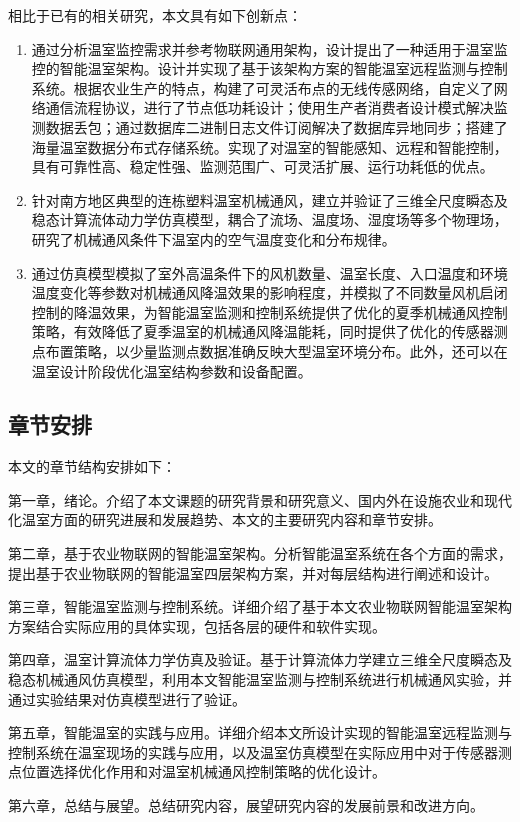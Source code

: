 相比于已有的相关研究，本文具有如下创新点：
		\begin{enumerate}
			\item 通过分析温室监控需求并参考物联网通用架构，设计提出了一种适用于温室监控的智能温室架构。设计并实现了基于该架构方案的智能温室远程监测与控制系统。根据农业生产的特点，构建了可灵活布点的无线传感网络，自定义了网络通信流程协议，进行了节点低功耗设计；使用生产者消费者设计模式解决监测数据丢包；通过数据库二进制日志文件订阅解决了数据库异地同步；搭建了海量温室数据分布式存储系统。实现了对温室的智能感知、远程和智能控制，具有可靠性高、稳定性强、监测范围广、可灵活扩展、运行功耗低的优点。
			\item 针对南方地区典型的连栋塑料温室机械通风，建立并验证了三维全尺度瞬态及稳态计算流体动力学仿真模型，耦合了流场、温度场、湿度场等多个物理场，研究了机械通风条件下温室内的空气温度变化和分布规律。
			\item 通过仿真模型模拟了室外高温条件下的风机数量、温室长度、入口温度和环境温度变化等参数对机械通风降温效果的影响程度，并模拟了不同数量风机启闭控制的降温效果，为智能温室监测和控制系统提供了优化的夏季机械通风控制策略，有效降低了夏季温室的机械通风降温能耗，同时提供了优化的传感器测点布置策略，以少量监测点数据准确反映大型温室环境分布。此外，还可以在温室设计阶段优化温室结构参数和设备配置。
		\end{enumerate}	
	\subsection{章节安排}
	本文的章节结构安排如下：
	
第一章，绪论。介绍了本文课题的研究背景和研究意义、国内外在设施农业和现代化温室方面的研究进展和发展趋势、本文的主要研究内容和章节安排。

第二章，基于农业物联网的智能温室架构。分析智能温室系统在各个方面的需求，提出基于农业物联网的智能温室四层架构方案，并对每层结构进行阐述和设计。

第三章，智能温室监测与控制系统。详细介绍了基于本文农业物联网智能温室架构方案结合实际应用的具体实现，包括各层的硬件和软件实现。

第四章，温室计算流体力学仿真及验证。基于计算流体力学建立三维全尺度瞬态及稳态机械通风仿真模型，利用本文智能温室监测与控制系统进行机械通风实验，并通过实验结果对仿真模型进行了验证。

第五章，智能温室的实践与应用。详细介绍本文所设计实现的智能温室远程监测与控制系统在温室现场的实践与应用，以及温室仿真模型在实际应用中对于传感器测点位置选择优化作用和对温室机械通风控制策略的优化设计。

第六章，总结与展望。总结研究内容，展望研究内容的发展前景和改进方向。